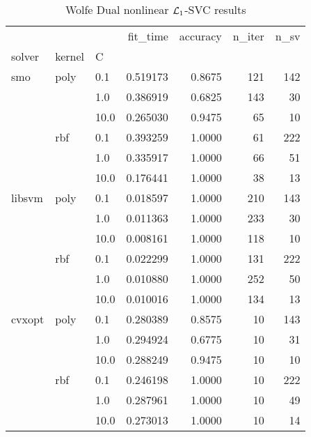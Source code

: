 \begin{table}[H]
\centering
\caption{Wolfe Dual nonlinear $\protect \mathcal{L}_1$-SVC results}
\label{nonlinear_dual_l1_svc_cv_results}
\begin{tabular}{lllrrrr}
\toprule
       &     &      &  fit\_time &  accuracy &  n\_iter &  n\_sv \\
solver & kernel & C &           &           &         &       \\
\midrule
smo & poly & 0.1  &  0.519173 &    0.8675 &     121 &   142 \\
       &     & 1.0  &  0.386919 &    0.6825 &     143 &    30 \\
       &     & 10.0 &  0.265030 &    0.9475 &      65 &    10 \\
       & rbf & 0.1  &  0.393259 &    1.0000 &      61 &   222 \\
       &     & 1.0  &  0.335917 &    1.0000 &      66 &    51 \\
       &     & 10.0 &  0.176441 &    1.0000 &      38 &    13 \\
libsvm & poly & 0.1  &  0.018597 &    1.0000 &     210 &   143 \\
       &     & 1.0  &  0.011363 &    1.0000 &     233 &    30 \\
       &     & 10.0 &  0.008161 &    1.0000 &     118 &    10 \\
       & rbf & 0.1  &  0.022299 &    1.0000 &     131 &   222 \\
       &     & 1.0  &  0.010880 &    1.0000 &     252 &    50 \\
       &     & 10.0 &  0.010016 &    1.0000 &     134 &    13 \\
cvxopt & poly & 0.1  &  0.280389 &    0.8575 &      10 &   143 \\
       &     & 1.0  &  0.294924 &    0.6775 &      10 &    31 \\
       &     & 10.0 &  0.288249 &    0.9475 &      10 &    10 \\
       & rbf & 0.1  &  0.246198 &    1.0000 &      10 &   222 \\
       &     & 1.0  &  0.287961 &    1.0000 &      10 &    49 \\
       &     & 10.0 &  0.273013 &    1.0000 &      10 &    14 \\
\bottomrule
\end{tabular}
\end{table}
